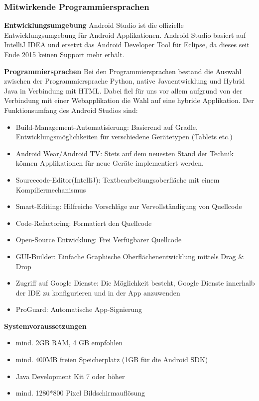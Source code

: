 \subsubsection{Mitwirkende Programmiersprachen}
\label{subsec:androidsprachen}
\textbf{Entwicklungsumgebung\newline}
Android Studio ist die offizielle Entwicklungsumgebung für Android Applikationen.
Android Studio basiert auf IntelliJ IDEA und ersetzt das Android Developer Tool für Eclipse, da dieses seit Ende
2015 keinen Support mehr erhält.

\textbf{Programmiersprachen\newline}
Bei den Programmiersprachen bestand die Auswahl zwischen der Programmiersprache Python, 
native Javaentwicklung und Hybrid Java in Verbindung mit HTML.
Dabei fiel für uns vor allem aufgrund von der Verbindung mit einer Webapplikation die Wahl auf eine hybride Applikation. 
Der Funktionsumfang des Android Studios sind: 
\begin{itemize}
\item Build-Management-Automatisierung: Basierend auf Gradle, Entwicklungsmöglichkeiten für verschiedene Gerätetypen (Tablets etc.)
\item Android Wear/Android TV: Stets auf dem neuesten Stand der Technik können Applikationen für neue Geräte implementiert werden.
\item Sourcecode-Editor(IntelliJ): Textbearbeitungsoberfläche mit einem Kompiliermechanismus
\item Smart-Editing: Hilfreiche Vorschläge zur Vervollständigung von Quellcode
\item Code-Refactoring: Formatiert den Quellcode
\item Open-Source Entwicklung: Frei Verfügbarer Quellcode
\item GUI-Builder: Einfache Graphische Oberflächenentwicklung mittels Drag \& Drop
\item Zugriff auf Google Dienste: Die Möglichkeit besteht, Google Dienste innerhalb der IDE zu konfigurieren und in der App anzuwenden
\item ProGuard: Automatische App-Signierung
\end{itemize}

\textbf{Systemvoraussetzungen\newline}
\begin{itemize}
\item mind. 2GB RAM, 4 GB empfohlen
\item mind. 400MB freien Speicherplatz (1GB für die Android SDK)
\item Java Development Kit 7 oder höher
\item mind. 1280*800 Pixel Bildschirmauflösung

\end{itemize}

